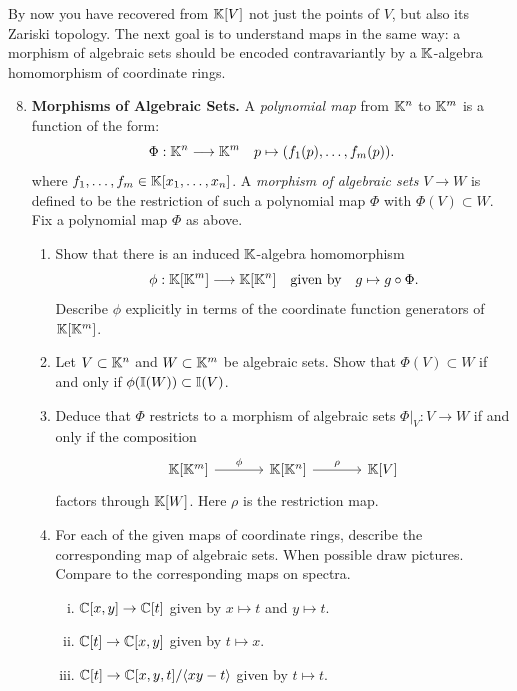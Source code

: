 \documentclass[12pt,reqno]{amsart}
\begin{document}
\hrulefill

By now you have recovered from $\mathbb{K}[V]$ not just the points of $V$, but also its Zariski topology. The next goal is to understand maps in the same way: a morphism of algebraic sets should be encoded contravariantly by a $\mathbb{K}$-algebra homomorphism of coordinate rings.

\hrulefill

\begin{enumerate}[leftmargin=*]
  \setcounter{enumi}{7}
\item \textbf{Morphisms of Algebraic Sets.} A \emph{polynomial map} from $\mathbb{K}^n$ to $\mathbb{K}^m$ is a function of the form: 
\[
\Phi: \mathbb{K}^n \longrightarrow \mathbb{K}^m \quad p \mapsto (f_1(p), \dots, f_{m}(p)).
\]
where  $f_1, \dots, f_m \in \mathbb{K}[x_1,\dots,x_n]$.  A \emph{morphism of algebraic sets} $V \to W$ is defined to be the restriction of such a polynomial map $\Phi$ with $\Phi(V) \subset W$. Fix a polynomial map $\Phi$ as above. 
\begin{enumerate}[label=(\alph*),ref=\theenumi\alph*]
	\item Show that there is an induced $\mathbb{K}$-algebra homomorphism
	\[
	\phi: \mathbb{K}[\mathbb{K}^{m}] \longrightarrow \mathbb{K}[\mathbb{K}^{n}] \quad \text{given by} \quad  g \mapsto g \circ \Phi.
	\]
	Describe $\phi$ explicitly in terms of the coordinate function generators of $\mathbb{K}[\mathbb{K}^{m}]$.
	\item Let $V \subset \mathbb{K}^n$ and $W \subset \mathbb{K}^m$ be algebraic sets. Show that $\Phi(V) \subset W$ if and only if $\phi(\mathbb{I}(W)) \subset \mathbb{I}(V)$.
	\item Deduce that $\Phi$ restricts to a morphism of algebraic sets $\Phi|_V : V \longrightarrow W$ if and only if the composition
	\[
	\begin{tikzcd}[row sep = .3em, column sep = 3.5em]
	\KK[\KK^m] \arrow[r, "\phi"] & \KK[\KK^n] \arrow[r, "\rho"] &\KK[V]
	\end{tikzcd}
	\]
	factors through $\mathbb{K}[W]$. Here $\rho$ is the restriction map.
	\item For each of the given maps of coordinate rings, describe the corresponding map of algebraic sets. When possible draw pictures. Compare to the corresponding maps on spectra.
	\begin{enumerate}[(i)]
		\item $\mathbb{C}[x,y] \rightarrow \mathbb{C}[t]$ given by $x\mapsto t$ and $y\mapsto t$.
		\item $\mathbb{C}[t] \rightarrow \mathbb{C}[x,y]$ given by $t \mapsto x$.
		\item $\mathbb{C}[t] \rightarrow \mathbb{C}[x,y,t]/\langle xy-t \rangle$ given by $t \mapsto t$. 
	\end{enumerate}
\end{enumerate}


\end{enumerate}
\end{document}
